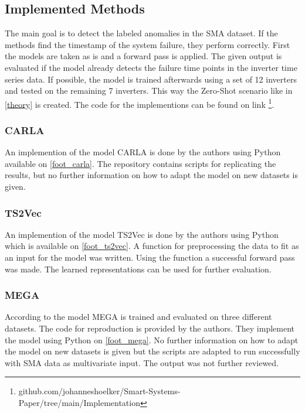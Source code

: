 
\subsection{Implemented Methods}
The main goal is to detect the labeled anomalies in the SMA dataset. If the methods find the timestamp of the system failure, they perform correctly. First the models are taken as is and a forward pass is applied. The given output is evaluated if the model already detects the failure time points in the inverter time series data. If possible, the model is trained afterwards using a set of 12 inverters and tested on the remaining 7 inverters. This way the Zero-Shot scenario like in \autoref{theory} is created.
The code for the implementions can be found on link \footnote{\fussy\tiny github.com/johanneshoelker/Smart-Systems-Paper/tree/main/Implementation}.

\subsubsection{CARLA}
An implemention of the model CARLA is done by the authors using Python available on \autoref{foot_carla}. The repository contains scripts for replicating the results, but no further information on how to adapt the model on new datasets is given.

\subsubsection{TS2Vec}
An implemention of the model TS2Vec is done by the authors using Python which is available on \autoref{foot_ts2vec}. A function for preprocessing the data to fit as an input for the model was written.
Using the function a successful forward pass was made. The learned representations can be used for further evaluation.

\subsubsection{MEGA}
According to \cite{wang_multiscale_2023} the model MEGA is trained and evaluated on three different datasets. The code for reproduction is provided by the authors. They implement the model using Python on \autoref{foot_mega}. No further information on how to adapt the model on new datasets is given but the scripts are adapted to run successfully with SMA data as multivariate input. The output was not further reviewed.

